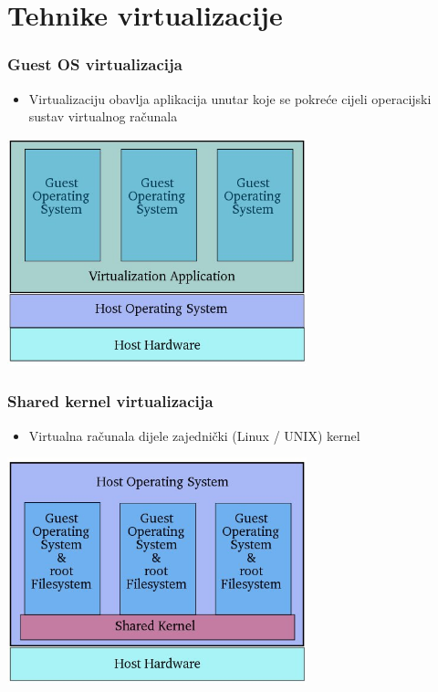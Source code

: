 \documentclass[t]{beamer}
\begin{document}
\section{Tehnike virtualizacije}

\begin{frame}
	\frametitle{Guest OS virtualizacija}
	\centering
	\begin{itemize}
		\item Virtualizaciju obavlja aplikacija unutar koje se pokreće cijeli operacijski sustav virtualnog računala
	\end{itemize}
	\includegraphics[width=0.65\textwidth]{guest_virt.jpg}
\end{frame}

\begin{frame}
	\frametitle{Shared kernel virtualizacija}
	\centering
	\begin{itemize}
		\item Virtualna računala dijele zajednički (Linux / UNIX) kernel
	\end{itemize}
	\includegraphics[width=0.65\textwidth]{shared_virt.jpg}
\end{frame}
\end{document}
